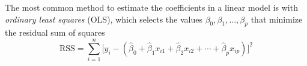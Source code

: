 \documentclass[final,onefignum,onetabnum]{siuro210301}
\newcommand{\argmin}[2]{\underset{#1}{\text{arg min}}\left\{#2\right\}}
\begin{document}
	The most common method to estimate the coefficients in a linear model is with \textit{ordinary least squares} (OLS), which selects the values $\beta_0, \beta_1, \dotsc, \beta_p$ that minimize the residual sum of squares
	\begin{equation}\label{eqn:RSS}
		\text{RSS} = \sum\limits_{i = 1}^n \Big[y_i - (\hat{\beta}_0 + \hat{\beta}_1 x_{i1} + \hat{\beta}_2 x_{i2} + \cdots + \hat{\beta}_p x_{ip})\Big]^2
	\end{equation}
	

	
\end{document}
